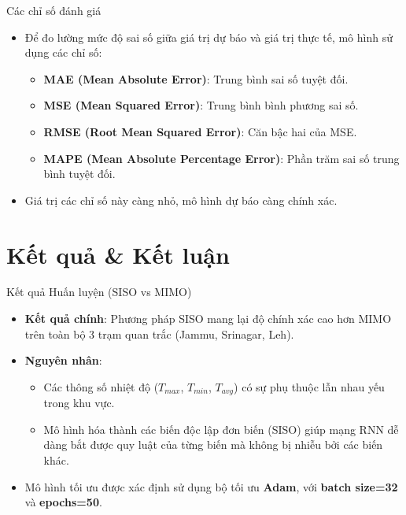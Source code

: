 \documentclass[aspectratio=169]{beamer}
\begin{document}
\begin{frame}{Các chỉ số đánh giá}
    \begin{itemize}
        \item Để đo lường mức độ sai số giữa giá trị dự báo và giá trị thực tế, mô hình sử dụng các chỉ số:
        \begin{itemize}
            \item \textbf{MAE (Mean Absolute Error)}: Trung bình sai số tuyệt đối.
            \item \textbf{MSE (Mean Squared Error)}: Trung bình bình phương sai số.
            \item \textbf{RMSE (Root Mean Squared Error)}: Căn bậc hai của MSE.
            \item \textbf{MAPE (Mean Absolute Percentage Error)}: Phần trăm sai số trung bình tuyệt đối.
        \end{itemize}
        \item Giá trị các chỉ số này càng nhỏ, mô hình dự báo càng chính xác.
    \end{itemize}
\end{frame}

\section{Kết quả \& Kết luận}

\begin{frame}{Kết quả Huấn luyện (SISO vs MIMO)}
    \begin{itemize}
        \item \textbf{Kết quả chính}: Phương pháp SISO mang lại độ chính xác cao hơn MIMO trên toàn bộ 3 trạm quan trắc (Jammu, Srinagar, Leh).
        \item \textbf{Nguyên nhân}:
        \begin{itemize}
            \item Các thông số nhiệt độ ($T_{max}$, $T_{min}$, $T_{avg}$) có sự phụ thuộc lẫn nhau yếu trong khu vực.
            \item Mô hình hóa thành các biến độc lập đơn biến (SISO) giúp mạng RNN dễ dàng bắt được quy luật của từng biến mà không bị nhiễu bởi các biến khác.
        \end{itemize}
        \item Mô hình tối ưu được xác định sử dụng bộ tối ưu \textbf{Adam}, với \textbf{batch size=32} và \textbf{epochs=50}.
    \end{itemize}
\end{frame}
\end{document}

